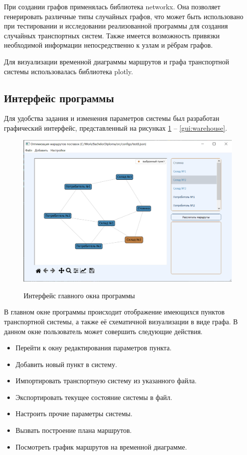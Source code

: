 При создании графов применялась библиотека networkx. Она позволяет генерировать различные типы случайных графов, что может быть использовано при тестировании и исследовании реализованной программы для создания случайных транспортных систем. Также имеется возможность привязки необходимой информации непосредственно к узлам и рёбрам графов.

Для визуализации временной диаграммы маршрутов и графа транспортной системы использовалась библиотека plotly\cite{libs:plotly}.

\subsection{Интерфейс программы}
Для удобства задания и изменения параметров системы был разработан графический интерфейс, представленный на рисунках \ref{gui:main} -- \ref{gui:warehouse}.

\begin{figure}[hp]
	\begin{center}
		{\includegraphics[scale=0.75, angle=0, page=1]{img/main_page.png}}
		\caption{Интерфейс главного окна программы}
		\label{gui:main}
	\end{center}
\end{figure}

В главном окне программы происходит отображение имеющихся пунктов транспортной системы, а также её схематичной визуализации в виде графа. В данном окне пользователь может совершить следующие действия.

\begin{itemize}
	\item Перейти к окну редактирования параметров пункта.
	\item Добавить новый пункт в систему.
	\item Импортировать транспортную систему из указанного файла.
	\item Экспортировать текущее состояние системы в файл.
	\item Настроить прочие параметры системы.
	\item Вызвать построение плана маршрутов.
	\item Посмотреть график маршрутов на временной диаграмме.
\end{itemize}

